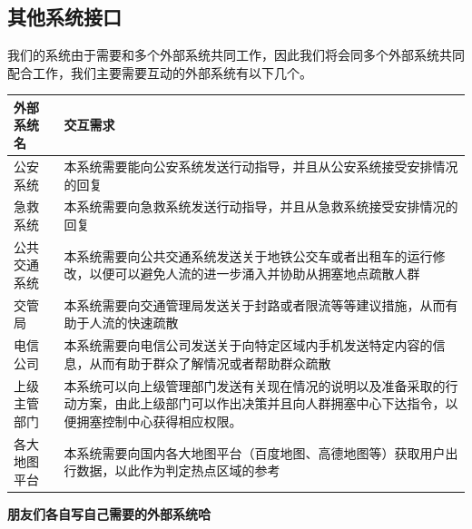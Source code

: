 \documentclass{ctexrep}
\begin{document}
\subsection{其他系统接口}
我们的系统由于需要和多个外部系统共同工作，因此我们将会同多个外部系统共同配合工作，我们主要需要互动的外部系统有以下几个。
\begin{longtable}{p{2cm}|p{10cm}}
\hline
外部系统名 & 交互需求 \\
\hline
\hline
公安系统 & 本系统需要能向公安系统发送行动指导，并且从公安系统接受安排情况的回复 \\
\hline
急救系统 & 本系统需要向急救系统发送行动指导，并且从急救系统接受安排情况的回复 \\
\hline
公共交通系统 & 本系统需要向公共交通系统发送关于地铁公交车或者出租车的运行修改，以便可以避免人流的进一步涌入并协助从拥塞地点疏散人群 \\
\hline
交管局 & 本系统需要向交通管理局发送关于封路或者限流等等建议措施，从而有助于人流的快速疏散\\
\hline
电信公司 & 本系统需要向电信公司发送关于向特定区域内手机发送特定内容的信息，从而有助于群众了解情况或者帮助群众疏散 \\
\hline
上级主管部门 & 本系统可以向上级管理部门发送有关现在情况的说明以及准备采取的行动方案，由此上级部门可以作出决策并且向人群拥塞中心下达指令，以便拥塞控制中心获得相应权限。\\
\hline
各大地图平台 & 本系统需要向国内各大地图平台（百度地图、高德地图等）获取用户出行数据，以此作为判定热点区域的参考 \\
\hline

\end{longtable}
\textbf{朋友们各自写自己需要的外部系统哈}
\end{document}
